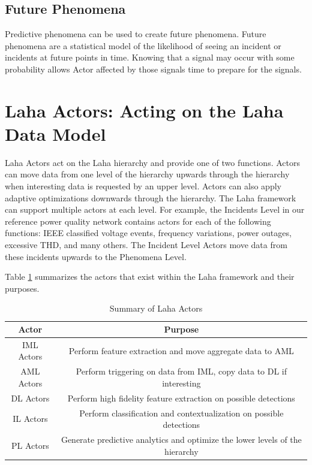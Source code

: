 \subsection{Future Phenomena}
Predictive phenomena can be used to create future phenomena. Future phenomena are a statistical model of the likelihood of seeing an incident or incidents at future points in time. Knowing that a signal may occur with some probability allows Actor affected by those signals time to prepare for the signals.

\section{Laha Actors: Acting on the Laha Data Model}
Laha Actors act on the Laha hierarchy and provide one of two functions. Actors can move data from one level of the hierarchy upwards through the hierarchy when interesting data is requested by an upper level. Actors can also apply adaptive optimizations downwards through the hierarchy. The Laha framework can support multiple actors at each level. For example, the Incidents Level in our reference power quality network contains actors for each of the following functions: IEEE classified voltage events, frequency variations, power outages, excessive THD, and many others. The Incident Level Actors move data from these incidents upwards to the Phenomena Level.  

Table \ref{laha-actors-tables} summarizes the actors that exist within the Laha framework and their purposes. 

\begin{table}
	\centering
	\caption{Summary of Laha Actors}
	\begin{tabular}{|c|c|}
		\hline
		Actor & Purpose \\
		\hline
		IML Actors & Perform feature extraction and move aggregate data to AML \\
		\hline
		AML Actors & Perform triggering on data from IML, copy data to DL if interesting \\
		\hline
		DL Actors & Perform high fidelity feature extraction on possible detections \\
		\hline
		IL Actors & Perform classification and contextualization on possible detections \\
		\hline
		PL Actors & Generate predictive analytics and optimize the lower levels of the hierarchy \\
		\hline
	\end{tabular}
	\label{laha-actors-tables}
\end{table}

